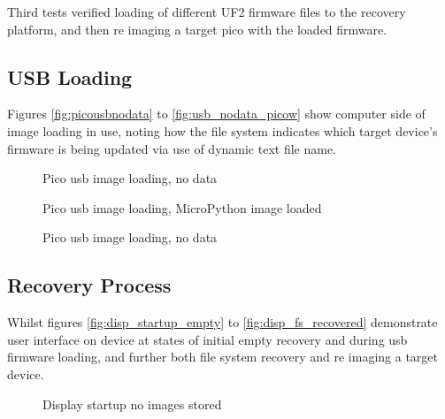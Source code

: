 Third tests verified loading of different UF2 firmware files to the recovery platform, and then re imaging a target pico with the loaded firmware.

\clearpage
\subsection{USB Loading}
Figures \autoref{fig:picousbnodata} to \autoref{fig:usb_nodata_picow} show computer side of image loading in use, noting how the file system indicates which target device's firmware is being updated via use of dynamic text file name.

\begin{figure}[ht]
	\centering
	\caption{Pico \gls{usb} image loading, no data}
	\label{fig:picousbnodata}
\end{figure}

\begin{figure}[ht]
	\centering
	\caption{Pico \gls{usb} image loading, MicroPython image loaded}
	\label{fig:picousbdata}
\end{figure}

\begin{figure}[ht]
	\centering
	\caption{Pico \gls{usb} image loading, no data}
	\label{fig:usb_nodata_picow}
\end{figure}

\clearpage
\subsection{Recovery Process}
Whilst figures \autoref{fig:disp_startup_empty} to \autoref{fig:disp_fs_recovered} demonstrate user interface on device at states of initial empty recovery and during \gls{usb} firmware loading, and further both file system recovery and re imaging a target device.

\begin{figure}[ht]
	\centering
	\caption{Display startup no images stored}
	\label{fig:disp_startup_empty}
\end{figure}

